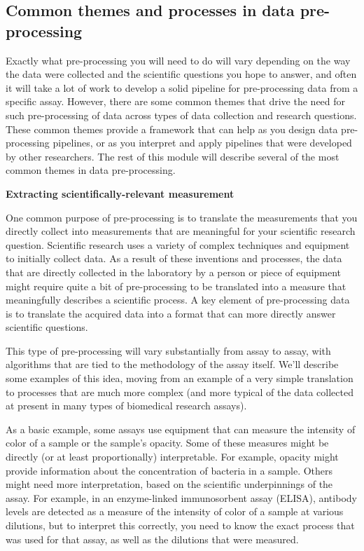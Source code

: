 \documentclass[]{tufte-book}
\begin{document}
\subsection{Common themes and processes in data pre-processing}\label{common-themes-and-processes-in-data-pre-processing}

Exactly what pre-processing you will need to do will vary depending on the way the data
were collected and the scientific questions you hope to answer, and often it
will take a lot of work to develop a solid pipeline for pre-processing data from
a specific assay. However, there are some common themes that drive the need for
such pre-processing of data across types of data collection and research
questions. These common themes provide a framework that can help as you design
data pre-processing pipelines, or as you interpret and apply pipelines that were
developed by other researchers. The rest of this module will describe several of
the most common themes in data pre-processing.

\textbf{Extracting scientifically-relevant measurement}

One common purpose of pre-processing is to translate the measurements that
you directly collect into measurements that are meaningful for your scientific
research question. Scientific research uses a variety of complex techniques and
equipment to initially collect data. As a result of these inventions and
processes, the data that are directly collected in the laboratory by a person or
piece of equipment might require quite a bit of pre-processing to be translated
into a measure that meaningfully describes a scientific process. A key element
of pre-processing data is to translate the acquired data into a format that can
more directly answer scientific questions.

This type of pre-processing will vary substantially from assay to assay, with
algorithms that are tied to the methodology of the assay itself. We'll describe
some examples of this idea, moving from an example of a very simple translation
to processes that are much more complex (and more typical of the data collected
at present in many types of biomedical research assays).

As a basic example, some assays use equipment that can measure the
intensity of color of a sample or the sample's opacity. Some of these measures
might be directly (or at least proportionally) interpretable. For example,
opacity might provide information about the concentration of bacteria
in a sample. Others might need more interpretation, based on the scientific
underpinnings of the assay. For example, in an enzyme-linked immunosorbent assay
(ELISA), antibody levels are detected as a measure of the intensity of color of
a sample at various dilutions, but to interpret this correctly, you need to know
the exact process that was used for that assay, as well as the dilutions that
were measured.
\end{document}
